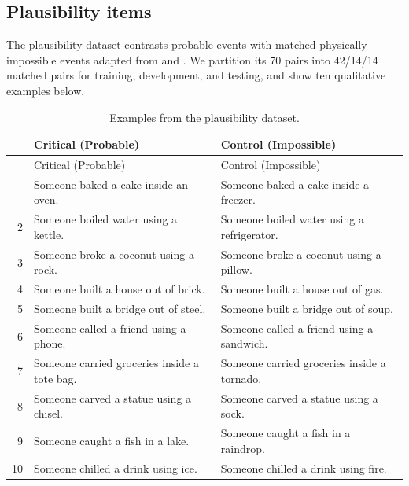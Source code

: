 \subsection{Plausibility items}
\label{app:plausibility-examples}

The plausibility dataset contrasts probable events with matched physically
impossible events adapted from \citet{hu-etal-2025-shades} and
\citet{lepori-etal-2026-fantasy}. We partition its 70 pairs into 42/14/14
matched pairs for training, development, and testing, and show ten qualitative
examples below.

\begingroup
\setlength{\tabcolsep}{4pt}
\renewcommand{\arraystretch}{1.08}
\begin{longtable}{@{}>{\footnotesize}r >{\footnotesize\raggedright\arraybackslash}p{.44\linewidth} >{\footnotesize\raggedright\arraybackslash}p{.44\linewidth}@{}}
\caption{Examples from the plausibility dataset.}
\label{tab:plausibility-examples}\\
\toprule
& Critical (Probable) & Control (Impossible) \\
\midrule
\endfirsthead
\toprule
& Critical (Probable) & Control (Impossible) \\
\midrule
\endhead
\bottomrule
\endfoot
1 & Someone baked a cake inside an oven. & Someone baked a cake inside a freezer. \\
2 & Someone boiled water using a kettle. & Someone boiled water using a refrigerator. \\
3 & Someone broke a coconut using a rock. & Someone broke a coconut using a pillow. \\
4 & Someone built a house out of brick. & Someone built a house out of gas. \\
5 & Someone built a bridge out of steel. & Someone built a bridge out of soup. \\
6 & Someone called a friend using a phone. & Someone called a friend using a sandwich. \\
7 & Someone carried groceries inside a tote bag. & Someone carried groceries inside a tornado. \\
8 & Someone carved a statue using a chisel. & Someone carved a statue using a sock. \\
9 & Someone caught a fish in a lake. & Someone caught a fish in a raindrop. \\
10 & Someone chilled a drink using ice. & Someone chilled a drink using fire. \\
\end{longtable}
\endgroup

